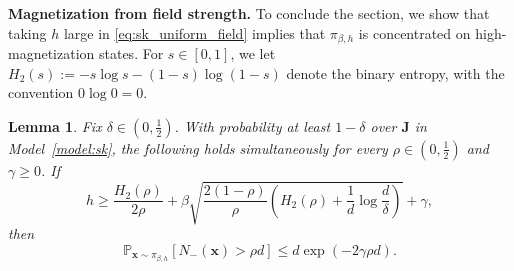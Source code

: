 \documentclass[11pt]{article}
\newtheorem{lemma}{Lemma}
\newcommand{\defeq}{:=}
\newcommand{\half}{\frac{1}{2}}
\newcommand{\1}{\mathbf{1}}
\newcommand{\0}{\mathbf{0}}
\newcommand{\Par}[1]{\left(#1\right)}
\newcommand{\Brack}[1]{\left[#1\right]}
\newcommand{\Prob}{\mathbb{P}}
\renewcommand{\Pr}{\Prob}
\newcommand{\mj}{{\mathbf{J}}}
\newcommand{\vx}{{\mathbf{x}}}
\begin{document}
\textbf{Magnetization from field strength.} To conclude the section, we show that taking $h$ large in \eqref{eq:sk_uniform_field} implies that $\pi_{\beta, h}$ is concentrated on high-magnetization states. 
For $s\in[0,1]$, we let
$H_2(s)
    \defeq
    -s\log s-(1-s)\log(1-s)$
denote the binary entropy, with the convention $0\log 0=0$.

\begin{lemma}\label{lem:gaussian_cut_concentration}
    Fix $\delta\in(0,\half)$. With probability at least $1-\delta$
    over $\mj$ in Model~\ref{model:sk}, the following holds simultaneously for every
    $\rho\in(0,\half)$ and $\gamma\ge0$. If
    \begin{equation}
        \label{eq:gaussian_cut_field_condition}
        h
        \ge
        \frac{H_2(\rho)}{2\rho}
        +
        \beta
        \sqrt{
            \frac{2(1-\rho)}{\rho}
            \Par{
                H_2(\rho)
                +
                \frac 1 d\log \frac d \delta
            }
        }
        +
        \gamma,
    \end{equation}
    then
    \[
       \Pr_{\vx \sim \pi_{\beta, h}}\Brack{N_-(\vx) > \rho d}
        \le
        d\exp\Par{-2\gamma\rho d}.
    \]
\end{lemma}
\end{document}
